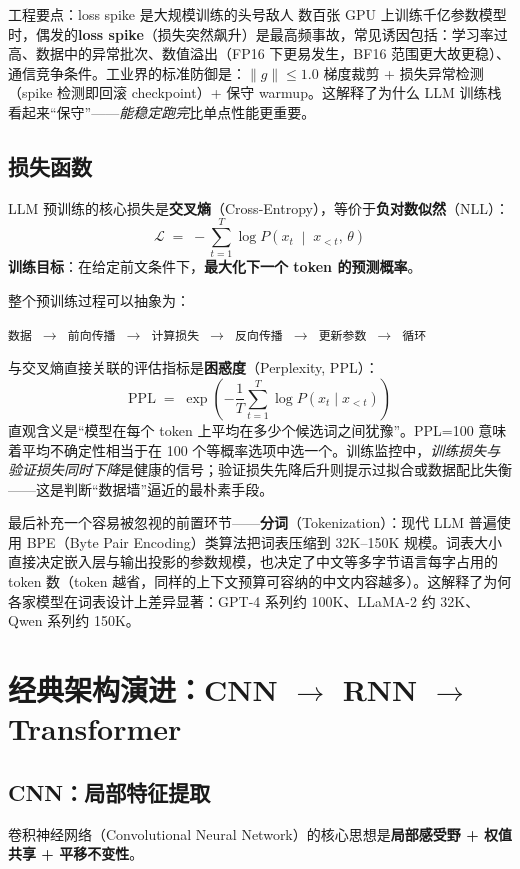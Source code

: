 \documentclass[12pt,a4paper]{article}
\begin{document}
\begin{keybox}{工程要点：loss spike 是大规模训练的头号敌人}
数百张 GPU 上训练千亿参数模型时，偶发的\textbf{loss spike}（损失突然飙升）是最高频事故，常见诱因包括：学习率过高、数据中的异常批次、数值溢出（FP16 下更易发生，BF16 范围更大故更稳）、通信竞争条件。工业界的标准防御是：$\|g\|\le 1.0$ 梯度裁剪 + 损失异常检测（spike 检测即回滚 checkpoint）+ 保守 warmup。这解释了为什么 LLM 训练栈看起来“保守”——\emph{能稳定跑完}比单点性能更重要。
\end{keybox}
\subsection{损失函数}
LLM 预训练的核心损失是\textbf{交叉熵}（Cross-Entropy），等价于\textbf{负对数似然}（NLL）：
\[
\mathcal{L} \;=\; -\sum_{t=1}^{T} \log P\!\left(x_t \;\middle|\; x_{<t},\, \theta\right)
\]
\textbf{训练目标}：在给定前文条件下，\textbf{最大化下一个 token 的预测概率}。

整个预训练过程可以抽象为：
\begin{center}
\texttt{数据 $\to$ 前向传播 $\to$ 计算损失 $\to$ 反向传播 $\to$ 更新参数 $\to$ 循环}
\end{center}

与交叉熵直接关联的评估指标是\textbf{困惑度}（Perplexity, PPL）：
\[
\text{PPL} \;=\; \exp\!\left(-\frac{1}{T}\sum_{t=1}^{T}\log P(x_t \mid x_{<t})\right)
\]
直观含义是“模型在每个 token 上平均在多少个候选词之间犹豫”。PPL=100 意味着平均不确定性相当于在 100 个等概率选项中选一个。训练监控中，\emph{训练损失与验证损失同时下降}是健康的信号；验证损失先降后升则提示过拟合或数据配比失衡——这是判断“数据墙”逼近的最朴素手段。

最后补充一个容易被忽视的前置环节——\textbf{分词}（Tokenization）：现代 LLM 普遍使用 BPE（Byte Pair Encoding）类算法把词表压缩到 32K--150K 规模。词表大小直接决定嵌入层与输出投影的参数规模，也决定了中文等多字节语言每字占用的 token 数（token 越省，同样的上下文预算可容纳的中文内容越多）。这解释了为何各家模型在词表设计上差异显著：GPT-4 系列约 100K、LLaMA-2 约 32K、Qwen 系列约 150K。
\section{经典架构演进：CNN $\to$ RNN $\to$ Transformer}
\subsection{CNN：局部特征提取}
卷积神经网络（Convolutional Neural Network）的核心思想是\textbf{局部感受野 + 权值共享 + 平移不变性}。
\end{document}
